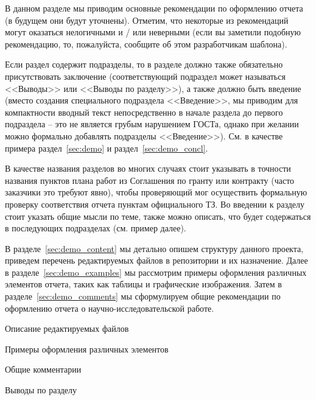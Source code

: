 В данном разделе мы приводим основные рекомендации по оформлению отчета (в будущем они будут уточнены).
Отметим, что некоторые из рекомендаций могут оказаться нелогичными и / или неверными (если вы заметили подобную рекомендацию, то, пожалуйста, сообщите об этом разработчикам шаблона).

Если раздел содержит подразделы, то в разделе должно также обязательно присутствовать заключение (соответствующий подраздел может называться <<Выводы>> или <<Выводы по разделу>>), а также должно быть введение (вместо создания специального подраздела <<Введение>>, мы приводим для компактности вводный текст непосредственно в начале раздела до первого подраздела -- это не является грубым нарушением ГОСТа, однако при желании можно формально добавлять подразделы <<Введение>>).
См. в качестве примера раздел~\ref{sec:demo} и раздел~\ref{sec:demo_concl}.

В качестве названия разделов во многих случаях стоит указывать в точности названия пунктов плана работ из Соглашения по гранту или контракту (часто заказчики это требуют явно), чтобы проверяющий мог осуществить формальную проверку соответствия отчета пунктам официального ТЗ.
Во введении к разделу стоит указать общие мысли по теме, также можно описать, что будет содержаться в последующих подразделах (см. пример далее).

В разделе~\ref{sec:demo_content} мы детально опишем структуру данного проекта, приведем перечень редактируемых файлов в репозитории и их назначение.
Далее в разделе~\ref{sec:demo_examples} мы рассмотрим примеры оформления различных элементов отчета, таких как таблицы и графические изображения.
Затем в разделе~\ref{sec:demo_comments} мы сформулируем общие рекомендации по оформлению отчета о научно-исследовательской работе.


    {Описание редактируемых файлов}

    {Примеры оформления различных элементов}

    {Общие комментарии}

    {Выводы по разделу}
